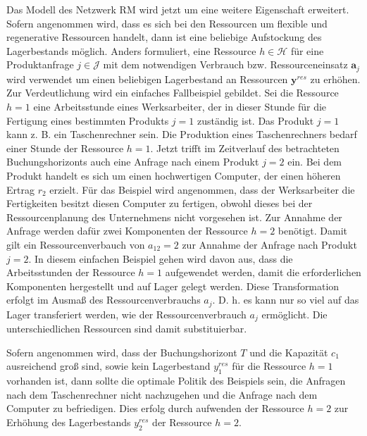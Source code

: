 Das Modell des Netzwerk RM wird jetzt um eine weitere Eigenschaft erweitert. Sofern angenommen wird, dass es sich bei den Ressourcen um flexible und regenerative Ressourcen handelt, dann ist eine beliebige Aufstockung des Lagerbestands möglich. Anders formuliert, eine Ressource $h\in\mathcal{H}$ für eine Produktanfrage $j\in\mathcal{J}$ mit dem notwendigen Verbrauch bzw. Ressourceneinsatz $\textbf{a}_j$ wird verwendet um einen beliebigen Lagerbestand an Ressourcen $\textbf{y}^{res}$ zu erhöhen. Zur Verdeutlichung wird ein einfaches Fallbeispiel gebildet. Sei die Ressource $h=1$ eine Arbeitsstunde eines Werksarbeiter, der in dieser Stunde für die Fertigung eines bestimmten Produkts $j=1$ zuständig ist. Das Produkt $j=1$ kann z. B. ein Taschenrechner sein. Die Produktion eines Taschenrechners bedarf einer Stunde der Ressource $h=1$. Jetzt trifft im Zeitverlauf des betrachteten Buchungshorizonts auch eine Anfrage nach einem Produkt $j=2$ ein. Bei dem Produkt handelt es sich um einen hochwertigen Computer, der einen höheren Ertrag $r_{2}$ erzielt. Für das Beispiel wird angenommen, dass der Werksarbeiter die Fertigkeiten besitzt diesen Computer zu fertigen, obwohl dieses bei der Ressourcenplanung des Unternehmens nicht vorgesehen ist. Zur Annahme der Anfrage werden dafür zwei Komponenten der Ressource $h=2$ benötigt. Damit gilt ein Ressourcenverbauch von $a_12=2$ zur Annahme der Anfrage nach Produkt $j=2$. In diesem einfachen Beispiel gehen wird davon aus, dass die Arbeitsstunden der Ressource $h=1$ aufgewendet werden, damit die erforderlichen Komponenten hergestellt und auf Lager gelegt werden. Diese Transformation erfolgt im Ausmaß des Ressourcenverbrauchs $a_{j}$. D. h. es kann nur so viel auf das Lager transferiert werden, wie der Ressourcenverbrauch $a_{j}$ ermöglicht. Die unterschiedlichen Ressourcen sind damit substituierbar.

Sofern angenommen wird, dass der Buchungshorizont $T$ und die Kapazität $c_1$ ausreichend groß sind, sowie kein Lagerbestand $y^{res}_1$ für die Ressource $h=1$ vorhanden ist, dann sollte die optimale Politik des Beispiels sein, die Anfragen nach dem Taschenrechner nicht nachzugehen und die Anfrage nach dem Computer zu befriedigen. Dies erfolg durch aufwenden der Ressource $h=2$ zur Erhöhung des Lagerbestands $y^{res}_{2}$ der Ressource $h=2$.

